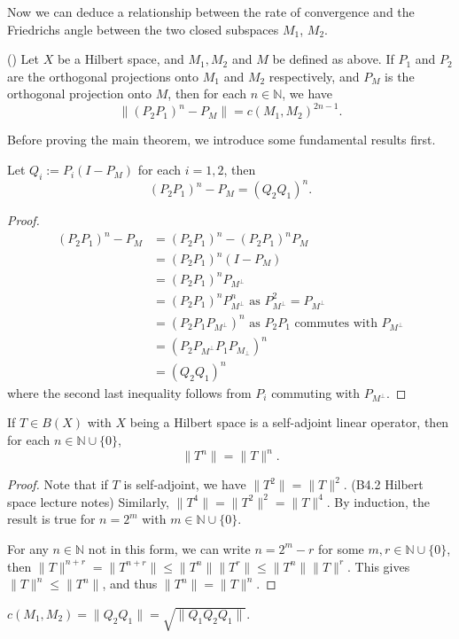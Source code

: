 Now we can deduce a relationship between the rate of convergence and the Friedrichs angle between the two closed subspaces $M_1$, $M_2$.
\begin{theorem}(\cite{KW88})\label{t1}
Let $X$ be a Hilbert space, and $M_1, M_2$ and $M$ be defined as above. If $P_1$ and $P_2$ are the orthogonal projections onto $M_1$ and $M_2$ respectively, and $P_M$ is the orthogonal projection onto $M$, then for each $n\in\mathbb{N}$, we have
$$\|(P_2P_1)^n-P_{M}\|=c(M_1,M_2)^{2n-1}.$$
\end{theorem}
Before proving the main theorem, we introduce some fundamental results first.
\begin{lemma}\label{l1}
Let $Q_i:=P_i(I-P_{M})$ for each $i=1,2$, then $$(P_2P_1)^n-P_M=(Q_2Q_1)^n.$$
\begin{proof}
\begin{align*}
(P_2P_1)^n-P_M &= (P_2P_1)^n-(P_2P_1)^n P_M\\
{}&=(P_2P_1)^n(I-P_M)\\
{}&=(P_2P_1)^n P_{M^{\perp}}\\
{}&=(P_2P_1)^n P_{M^{\perp}}^n  \mbox{ as } P_{M^{\perp}}^2=P_{M^{\perp}} \\
{}&= (P_2P_1 P_{M^{\perp}})^n   \mbox{ as } P_2P_1 \mbox{ commutes with } P_{M^{\perp}}\\
{}&=(P_2 P_{M^{\perp}} P_1 P_{M_{\perp}})^n\\
{}&=(Q_2Q_1)^n
\end{align*}
where the second last inequality follows from $P_i$ commuting with $P_{M^{\perp}}$.
\end{proof}
\begin{lemma}\label{l2}
If $T\in B(X)$ with $X$ being a Hilbert space is a self-adjoint linear operator, then for each $n\in\mathbb{N}\cup\{0\}$,
$$\|T^n\|=\|T\|^n.$$
\end{lemma}
\begin{proof}
Note that if $T$ is self-adjoint, we have $\|T^2\|=\|T\|^2$. (B4.2 Hilbert space lecture notes) 
Similarly, $\|T^4\|=\|T^2\|^2=\|T\|^4$. By induction, the result is true for $n=2^m$ with $m\in \mathbb{N}\cup\{0\}$.  

For any $n\in\mathbb{N}$ not in this form, we can write $n=2^m-r$ for some $m,r\in\mathbb{N}\cup\{0\}$, then 
$\|T\|^{n+r}=\|T^{n+r}\|\leq \|T^{n}\|\|T^r\|\leq\|T^n\|\|T\|^r$. This gives $\|T\|^n\leq \|T^n\|$, and thus $\|T^n\|=\|T\|^n$.
\end{proof}
\end{lemma} 
\begin{lemma}\label{l3}
$c(M_1,M_2)=\|Q_2Q_1\|=\sqrt{\|Q_1Q_2Q_1\|}$.
\end{lemma}

